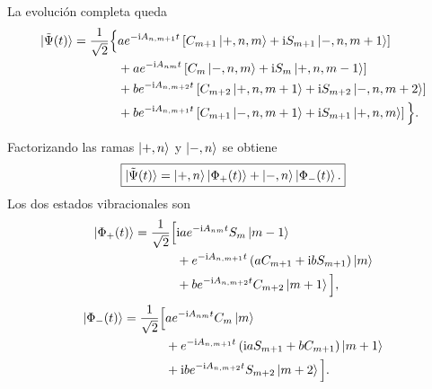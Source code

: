 La evoluci\'on completa queda
\begin{equation}
\begin{aligned}
  \ket{\tilde\Psi(t)}
  =\frac{1}{\sqrt2}\Big\{&
  a e^{-\mathrm{i} A_{n,m+1}t}
  \left[
  C_{m+1}\ket{+,n,m}
  +\mathrm{i} S_{m+1}\ket{-,n,m+1}
  \right]
  \\
  &+
  a e^{-\mathrm{i} A_{nm}t}
  \left[
  C_m\ket{-,n,m}
  +\mathrm{i} S_m\ket{+,n,m-1}
  \right]
  \\
  &+
  b e^{-\mathrm{i} A_{n,m+2}t}
  \left[
  C_{m+2}\ket{+,n,m+1}
  +\mathrm{i} S_{m+2}\ket{-,n,m+2}
  \right]
  \\
  &+
  b e^{-\mathrm{i} A_{n,m+1}t}
  \left[
  C_{m+1}\ket{-,n,m+1}
  +\mathrm{i} S_{m+1}\ket{+,n,m}
  \right]
  \Big\}.
\end{aligned}
\end{equation}

Factorizando las ramas $\ket{+,n}$ y $\ket{-,n}$ se obtiene
\begin{equation}
  \boxed{
  \ket{\tilde\Psi(t)}
  =
  \ket{+,n}\ket{\Phi_+(t)}
  +
  \ket{-,n}\ket{\Phi_-(t)}.
  }
\end{equation}
Los dos estados vibracionales son
\begin{equation}
\begin{aligned}
  \ket{\Phi_+(t)}
  =\frac{1}{\sqrt2}\Big[&
  \mathrm{i} a e^{-\mathrm{i} A_{nm}t}S_m\ket{m-1}
  \\
  &+
  e^{-\mathrm{i} A_{n,m+1}t}
  \left(aC_{m+1}+\mathrm{i} bS_{m+1}\right)\ket m
  \\
  &+
  b e^{-\mathrm{i} A_{n,m+2}t}C_{m+2}\ket{m+1}
  \Big],
\end{aligned}
\end{equation}
\begin{equation}
\begin{aligned}
  \ket{\Phi_-(t)}
  =\frac{1}{\sqrt2}\Big[&
  a e^{-\mathrm{i} A_{nm}t}C_m\ket m
  \\
  &+
  e^{-\mathrm{i} A_{n,m+1}t}
  \left(\mathrm{i} aS_{m+1}+bC_{m+1}\right)\ket{m+1}
  \\
  &+
  \mathrm{i} b e^{-\mathrm{i} A_{n,m+2}t}S_{m+2}\ket{m+2}
  \Big].
\end{aligned}
\end{equation}

